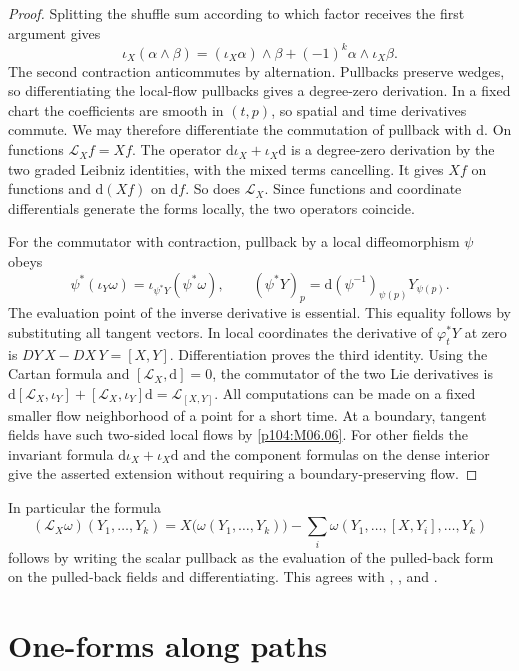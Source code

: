 \documentclass[11pt,oneside,openany]{book}
\theoremstyle{definition}
\theoremstyle{remark}
\newcommand{\dd}{\mathrm d}
\begin{document}
\begin{proof}
Splitting the shuffle sum according to which factor receives the first argument gives
\[
 \iota_X(\alpha\wedge\beta)
 =(\iota_X\alpha)\wedge\beta+(-1)^k\alpha\wedge\iota_X\beta .
\]
The second contraction anticommutes by alternation. Pullbacks preserve wedges, so differentiating the local-flow pullbacks gives a degree-zero derivation. In a fixed chart the coefficients are smooth in \((t,p)\), so spatial and time derivatives commute. We may therefore differentiate the commutation of pullback with \(\dd\). On functions \(\mathcal L_X f=Xf\). The operator \(\dd\iota_X+\iota_X\dd\) is a degree-zero derivation by the two graded Leibniz identities, with the mixed terms cancelling. It gives \(Xf\) on functions and \(\dd(Xf)\) on \(\dd f\). So does \(\mathcal L_X\). Since functions and coordinate differentials generate the forms locally, the two operators coincide.

For the commutator with contraction, pullback by a local diffeomorphism \(\psi\) obeys
\[
 \psi^*(\iota_Y\omega)=\iota_{\psi^*Y}(\psi^*\omega),\qquad
 (\psi^*Y)_p=\dd(\psi^{-1})_{\psi(p)}Y_{\psi(p)}.
\]
The evaluation point of the inverse derivative is essential. This equality follows by substituting all tangent vectors. In local coordinates the derivative of \(\varphi_t^*Y\) at zero is \(DY\,X-DX\,Y=[X,Y]\). Differentiation proves the third identity. Using the Cartan formula and \([\mathcal L_X,\dd]=0\), the commutator of the two Lie derivatives is
\(\dd[\mathcal L_X,\iota_Y]+[\mathcal L_X,\iota_Y]\dd=\mathcal L_{[X,Y]}\).
All computations can be made on a fixed smaller flow neighborhood of a point for a short time. At a boundary, tangent fields have such two-sided local flows by \cref{p104:M06.06}. For other fields the invariant formula \(\dd\iota_X+\iota_X\dd\) and the component formulas on the dense interior give the asserted extension without requiring a boundary-preserving flow.
\end{proof}

In particular the formula
\[
 (\mathcal L_X\omega)(Y_1,\ldots,Y_k)
 =X\big(\omega(Y_1,\ldots,Y_k)\big)
   -\sum_i\omega(Y_1,\ldots,[X,Y_i],\ldots,Y_k)
\]
follows by writing the scalar pullback as the evaluation of the pulled-back form on the pulled-back fields and differentiating. This agrees with \cite[Propositions 14.33 and 14.34, Theorem 14.35 and Corollary 14.36]{lee}, \cite[Section 20]{tu}, and \cite[pp.~225, 232]{tuerrata}.

\section{One-forms along paths}
\end{document}
